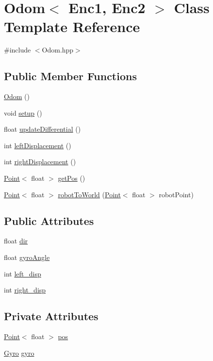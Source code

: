 \hypertarget{classOdom}{\section{Odom$<$ Enc1, Enc2 $>$ Class Template Reference}
\label{classOdom}
}


{\ttfamily \#include $<$Odom.\-hpp$>$}

\subsection*{Public Member Functions}
\begin{DoxyCompactItemize}
\item 
\hyperlink{classOdom_ab45cc0ea11f5300b84afe6133859a2c2}{Odom} ()
\item 
void \hyperlink{classOdom_a6736e8d83d7276bc7b4a656b9dc8dda5}{setup} ()
\item 
float \hyperlink{classOdom_ab1627e2cf01e2d9869d24027a1a98469}{update\-Differential} ()
\item 
int \hyperlink{classOdom_aad18072b90a4f0951165577a014024de}{left\-Displacement} ()
\item 
int \hyperlink{classOdom_aee42d44f07335600703f40061a01836e}{right\-Displacement} ()
\item 
\hyperlink{classPoint}{Point}$<$ float $>$ \hyperlink{classOdom_adf58a66718029d08c7bd47d5cebfefb6}{get\-Pos} ()
\item 
\hyperlink{classPoint}{Point}$<$ float $>$ \hyperlink{classOdom_a07f630244bd18439ab5e057dfab0587f}{robot\-To\-World} (\hyperlink{classPoint}{Point}$<$ float $>$ robot\-Point)
\end{DoxyCompactItemize}
\subsection*{Public Attributes}
\begin{DoxyCompactItemize}
\item 
float \hyperlink{classOdom_ad2308d2e662650534d2a85aad6c97349}{dir}
\item 
float \hyperlink{classOdom_a4c4c2d005150e15fef0db14e923bfca3}{gyro\-Angle}
\item 
int \hyperlink{classOdom_aa29154456ebb189815df2501cc8eb2fd}{left\-\_\-disp}
\item 
int \hyperlink{classOdom_a967a8ce7e6bea53de203e37cf180389a}{right\-\_\-disp}
\end{DoxyCompactItemize}
\subsection*{Private Attributes}
\begin{DoxyCompactItemize}
\item 
\hyperlink{classPoint}{Point}$<$ float $>$ \hyperlink{classOdom_a0e43d9feb433dec91e7a08cee64d732b}{pos}
\item 
\hyperlink{classGyro}{Gyro} \hyperlink{classOdom_a52380c80a1c7072904a766a59e09d3b5}{gyro}
\end{DoxyCompactItemize}
